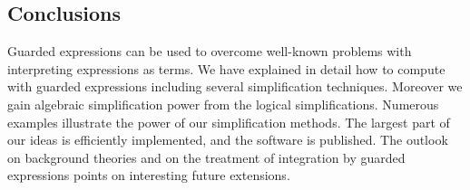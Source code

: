 \subsection{Conclusions}
Guarded expressions can be used to overcome well-known problems with
interpreting expressions as terms. We have explained in detail how to
compute with guarded expressions including several simplification
techniques. Moreover we gain algebraic simplification power from the
logical simplifications. Numerous examples illustrate the power of our
simplification methods. The largest part of our ideas is efficiently
implemented, and the software is published. The outlook on background
theories and on the treatment of integration by guarded expressions
points on interesting future extensions.
\nocite{Bradford:92}
